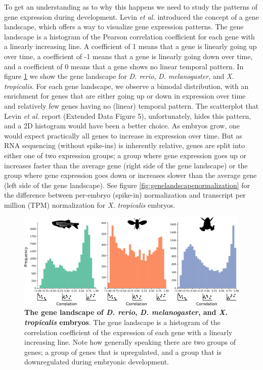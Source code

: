 To get an understanding as to why this happens we need to study the patterns of gene expression during development. Levin \textit{et al.} introduced the concept of a gene landscape, which offers a way to visualize gene expression patterns. The gene landscape is a histogram of the Pearson correlation coefficient for each gene with a linearly increasing line. A coefficient of 1 means that a gene is linearly going up over time, a coefficient of -1 means that a gene is linearly going down over time, and a coefficient of 0 means that a gene shows no linear temporal pattern. In figure \ref{fig:genelandscape} we show the gene landscape for \textit{D. rerio}, \textit{D. melanogaster}, and \textit{X. tropicalis}. For each gene landscape, we observe a bimodal distribution, with an enrichment for genes that are either going up or down in expression over time and relatively few genes having no (linear) temporal pattern. The scatterplot that Levin \textit{et al.} report (Extended Data Figure 5\cite{Levin2016}), unfortunately, hides this pattern, and a 2D histogram would have been a better choice. As embryos grow, one would expect practically all genes to increase in expression over time. But as RNA sequencing (without spike-ins) is inherently relative, genes are split into either one of two expression groups; a group where gene expression goes up or increases faster than the average gene (right side of the gene landscape) or the group where gene expression goes down or increases slower than the average gene (left side of the gene landscape). See figure \ref{fig:genelandscapenormalization} for the difference between per-embryo (spike-in) normalization and transcript per million (TPM) normalization for \textit{X. tropicalis} embryos.

\begin{figure}[H]
    \includegraphics[width=\linewidth]{ch.hourglass/images/gene_landscape.png}
    \caption{\textbf{The gene landscape of \textit{D. rerio}, \textit{D. melanogaster}, and \textit{X. tropicalis} embryos}. The gene landscape is a histogram of the correlation coefficient of the expression of each gene with a linearly increasing line. Note how generally speaking there are two groups of genes; a group of genes that is upregulated, and a group that is downregulated during embryonic development.}
    \label{fig:genelandscape}
\end{figure}

